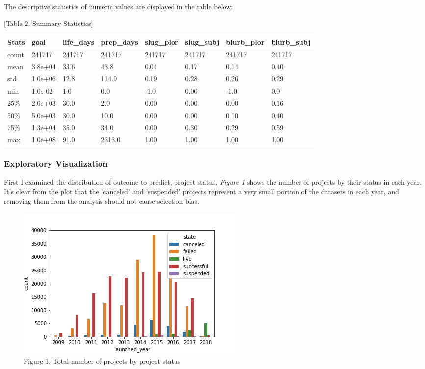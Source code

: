 \documentclass[11pt]{article}
\makeatletter
\def\maxwidth{\ifdim\Gin@nat@width>\linewidth\linewidth
    \else\Gin@nat@width\fi}
\let\Oldincludegraphics\includegraphics
\renewcommand{\includegraphics}[1]{\Oldincludegraphics[width=.8\maxwidth]{#1}}
\makeatother
\begin{document}
The descriptive statistics of numeric values are displayed in the table
below:

{[}Table 2. Summary Statistics{]}

\begin{longtable}[]{@{}llllllll@{}}
\toprule
Stats & goal & life\_days & prep\_days & slug\_plor & slug\_subj &
blurb\_plor & blurb\_subj\tabularnewline
\midrule
\endhead
count & 241717 & 241717 & 241717 & 241717 & 241717 & 241717 &
241717\tabularnewline
mean & 3.8e+04 & 33.6 & 43.8 & 0.04 & 0.17 & 0.14 & 0.40\tabularnewline
std & 1.0e+06 & 12.8 & 114.9 & 0.19 & 0.28 & 0.26 & 0.29\tabularnewline
min & 1.0e-02 & 1.0 & 0.0 & -1.0 & 0.00 & -1.0 & 0.0\tabularnewline
25\% & 2.0e+03 & 30.0 & 2.0 & 0.00 & 0.00 & 0.00 & 0.16\tabularnewline
50\% & 5.0e+03 & 30.0 & 10.0 & 0.00 & 0.00 & 0.10 & 0.40\tabularnewline
75\% & 1.3e+04 & 35.0 & 34.0 & 0.00 & 0.30 & 0.29 & 0.59\tabularnewline
max & 1.0e+08 & 91.0 & 2313.0 & 1.00 & 1.00 & 1.00 & 1.00\tabularnewline
\bottomrule
\end{longtable}

\subsubsection{Exploratory
Visualization}\label{exploratory-visualization}

First I examined the distribution of outcome to predict, project status.
\emph{Figure 1} shows the number of projects by their status in each
year. It's clear from the plot that the 'canceled' and 'suspended'
projects represent a very small portion of the datasets in each year,
and removing them from the analysis should not cause selection bias.

\begin{figure}
\centering
\includegraphics{plots/state_year.png}
\caption{Figure 1. Total number of projects by project status}
\end{figure}
\end{document}
